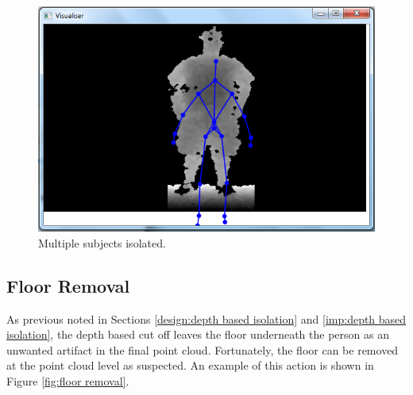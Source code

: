 \begin{figure}[h]
\begin{center}
\includegraphics[scale=0.3]{images/wilkoiso} 
\end{center}
\caption{Multiple subjects isolated.}
\label{fig:multiple subjects isolated}
\end{figure} 

\subsection{Floor Removal}
As previous noted in Sections \ref{design:depth based isolation} and \ref{imp:depth based isolation}, the depth based cut off leaves the floor underneath the person as an unwanted artifact in the final point cloud. Fortunately, the floor can be removed at the point cloud level as suspected. An example of this action is shown in Figure \ref{fig:floor removal}.\\

